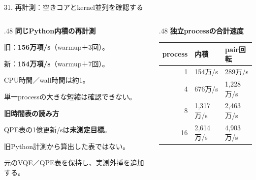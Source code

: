 \begin{frame}{31. 再計測：空きコアとkernel並列を確認する}
  \begin{columns}[T,onlytextwidth]
    \begin{column}{.48\textwidth}
      \textbf{同じPython内積の再計測}\par
      \small 旧：\textbf{156万項/s}（warmup＋3回）。\par
      新：\textbf{154万項/s}（warmup＋7回）。\par
      CPU時間／wall時間は約1。\par
      単一processの大きな短縮は確認できない。\par\medskip
      \textbf{旧時間表の読み方}\par
      \small QPE表の1億更新/sは\textbf{未測定目標}。\par
      旧Python計測から算出した表ではない。\par
      元のVQE／QPE表を保持し、実測外挿を追加する。
    \end{column}
    \begin{column}{.48\textwidth}
      \textbf{独立processの合計速度}\par\small
      \begin{tabularx}{\linewidth}{@{}rXX@{}}
        \toprule process & 内積 & pair回転 \\
        \midrule
        1 & 154万/s & 289万/s \\
        4 & 676万/s & 1,228万/s \\
        8 & 1,317万/s & 2,463万/s \\
        16 & 2,614万/s & 4,903万/s \\
        \bottomrule
      \end{tabularx}
    \end{column}
  \end{columns}
\end{frame}

